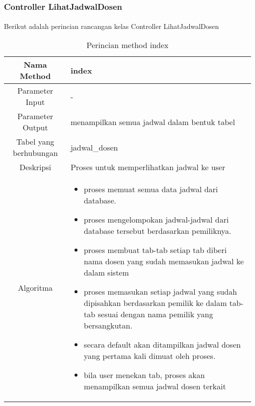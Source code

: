 \subsubsection{Controller LihatJadwalDosen}
\paragraph{} Berikut adalah perincian rancangan kelas Controller LihatJadwalDosen
\begin{center}
\begin{table}[H]
\caption{Perincian method index}
\begin{tabular}{|c|p{11cm}|}
\hline
Nama Method 	& 	index 	\\
\hline
Parameter Input & - \\
\hline
Parameter Output & menampilkan semua jadwal dalam bentuk tabel \\
\hline
Tabel yang berhubungan & jadwal\_dosen \\
\hline
Deskripsi	& Proses untuk memperlihatkan jadwal ke user \\
\hline
Algoritma	& \begin{itemize}
				\item proses memuat semua data jadwal dari database.
				\item proses mengelompokan jadwal-jadwal dari database tersebut berdasarkan pemiliknya.
				\item proses membuat tab-tab setiap tab diberi nama dosen yang sudah memasukan jadwal ke dalam sistem
				\item proses memasukan setiap jadwal yang sudah dipisahkan berdasarkan pemilik ke dalam tab-tab sesuai dengan nama pemilik yang bersangkutan.
				\item secara default akan ditampilkan jadwal dosen yang pertama kali dimuat oleh proses.
				\item bila user menekan tab, proses akan menampilkan semua jadwal dosen terkait
				\end{itemize} \\
\hline
\end{tabular}
\end{table}
\end{center}


